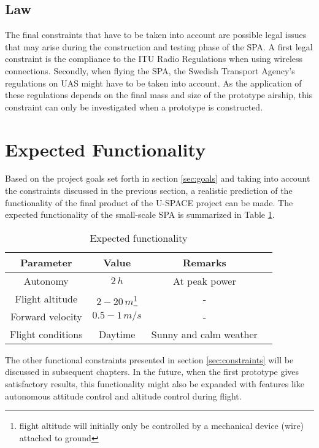 \subsection{Law}
%
The final constraints that have to be taken into account are possible legal issues that may arise during the construction and testing phase of the \ac{SPA}. A first legal constraint is the compliance to the \ac{ITU} Radio Regulations \cite{book:freqalloc} when using wireless connections. Secondly, when flying the \ac{SPA}, the Swedish Transport Agency's regulations on \ac{UAS} \cite{regulations:uas2009} might have to be taken into account. As the application of these regulations depends on the final mass and size of the prototype airship, this constraint can only be investigated when a prototype is constructed.
%
\section{Expected Functionality}
%
Based on the project goals set forth in section \ref{sec:goals} and taking into account the constraints discussed in the previous section, a realistic prediction of the functionality of the final product of the \ac{U-SPACE} project can be made. The expected functionality of the small-scale \ac{SPA} is summarized in Table \ref{tab:expected}.
%
\begin{table}[H]
\centering
\caption{Expected functionality}
\label{tab:expected}
\begin{tabular}{c c c c}
\hline
\textbf{Parameter} & \textbf{Value} & \textbf{Remarks}\\ \hline
Autonomy & $2\,h$ & At peak power\\
Flight altitude & $2-20\,m$\footnote{flight altitude will initially only be controlled by a mechanical device (wire) attached to ground} & -\\
Forward velocity & $0.5-1\,m/s$ & -\\
Flight conditions & Daytime & Sunny and calm weather\\
\hline
\end{tabular}
\end{table}
%
\noindent
The other functional constraints presented in section \ref{sec:constraints} will be discussed in subsequent chapters. In the future, when the first prototype gives satisfactory results, this functionality might also be expanded with features like autonomous attitude control and altitude control during flight.


